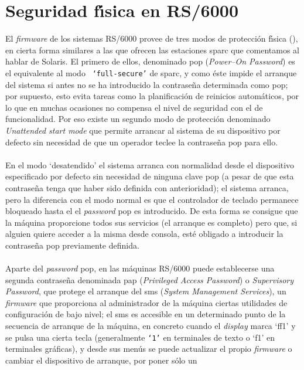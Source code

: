 \section{Seguridad f\'{\i}sica en RS/6000}
El {\it firmware} de los sistemas RS/6000 provee de tres modos de protecci\'on
f\'{\i}sica (\cite{kn:ibm00}), en cierta forma similares a las que ofrecen las 
estaciones {\sc
sparc} que comentamos al hablar de Solaris. El primero de ellos, denominado 
{\sc pop} ({\it Power--On Password}) es el equivalente al modo {\tt 
`full-secure'} de {\sc sparc}, y como \'este impide el arranque del sistema si 
antes no se ha introducido la contrase\~na determinada como {\sc pop}; por
supuesto, esto evita tareas como la planificaci\'on de reinicios autom\'aticos,
por lo que en muchas ocasiones no compensa el nivel de seguridad con el de
funcionalidad. Por eso existe un segundo modo de protecci\'on denominado {\it
Unattended start mode} que permite arrancar al sistema de su dispositivo por
defecto sin necesidad de que un operador teclee la contrase\~na {\sc pop} para
ello.\\
\\En el modo `desatendido' el sistema arranca con normalidad desde el 
dispositivo especificado por defecto sin necesidad de ninguna clave {\sc pop} 
(a pesar de que esta contrase\~na tenga que haber sido definida con 
anterioridad); el sistema arranca, pero la diferencia con el modo normal es que 
el controlador de teclado permanece bloqueado hasta el el {\it password} {\sc 
pop} es introducido. De esta forma se consigue que la m\'aquina proporcione 
todos sus servicios (el arranque es completo) pero que, si alguien quiere 
acceder a la misma desde consola, est\'e obligado a introducir la contrase\~na
{\sc pop} previamente definida.\\
\\Aparte del {\it password} {\sc pop}, en las m\'aquinas RS/6000 puede 
establecerse una segunda contrase\~na denominada {\sc pap} ({\it Privileged
Access Password}) o {\it Supervisory Password}, que protege el arranque del 
{\sc sms} 
({\it System Management Services}), un {\it firmware} que proporciona al
administrador de la m\'aquina ciertas utilidades de configuraci\'on de bajo 
nivel; el {\sc sms} es accesible en un determinado punto de la secuencia de
arranque de la m\'aquina, en concreto cuando el {\it display} marca {\sc `ff1'} 
y se pulsa una cierta tecla (generalmente {\tt `1'} en terminales de texto o 
{\sc `f1'} en terminales gr\'aficas), y desde sus men\'us se puede actualizar el
propio {\it firmware} o cambiar el dispositivo de arranque, por poner s\'olo un
